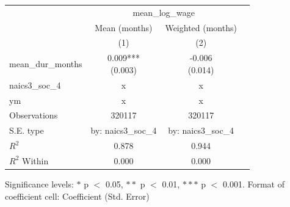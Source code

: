 \renewcommand\cellalign{t}
\begin{threeparttable}
\begin{tabular}{lccc}
\toprule
 & \multicolumn{2}{c}{mean_log_wage} \\
\cmidrule(lr){2-3} 
 & Mean (months) & Weighted (months) \\
 & (1) & (2) \\
\midrule
\addlinespace
mean_dur_months & \makecell{0.009*** \\ (0.003)} & \makecell{-0.006 \\ (0.014)} \\
\midrule
\addlinespace
naics3_soc_4 & x & x \\
ym & x & x \\
\midrule
\addlinespace
Observations & 320117 & 320117 \\
S.E. type & by: naics3_soc_4 & by: naics3_soc_4 \\
$R^2$ & 0.878 & 0.944 \\
$R^2$ Within & 0.000 & 0.000 \\
\bottomrule
\end{tabular}
\footnotesize Significance levels: $*$ p $<$ 0.05, $**$ p $<$ 0.01, $***$ p $<$ 0.001. Format of coefficient cell: Coefficient 
 (Std. Error)
\end{threeparttable}